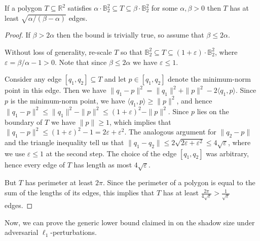\documentclass{article}\usepackage[a4paper,margin=20mm]{geometry}
\newcommand{\R}{\mathbb R}
\newcommand{\eps}{\varepsilon} %
\newcommand{\ball}{\mathbb{B}_2}
\renewcommand{\subset}{\subseteq}
\begin{document}
\begin{lemma}\label{lem:edgecount}
If a polygon $T \subset \R^2$ satisfies $\alpha\cdot \ball^2 \subset T \subset \beta\cdot \ball^2$
for some $\alpha, \beta > 0$ then $T$ has at least $\sqrt{\alpha/(\beta - \alpha)}$ edges.
\end{lemma}
\begin{proof}
If $\beta > 2\alpha$ then the bound is trivially true,
so assume that $\beta \leq 2\alpha$.

Without loss of generality, re-scale $T$ so that $\ball^2 \subset T \subset (1+\eps)\cdot \ball^2$,
where $\eps = \beta/\alpha - 1 > 0$. Note that since $\beta \leq 2 \alpha$ we have $\eps \leq 1$.

Consider any edge $[q_1, q_2] \subset T$ and let $p \in [q_1,q_2]$ denote
the minimum-norm point in this edge.
Then we have $\|q_1 - p\|^2 = \|q_1\|^2 + \|p\|^2 - 2\langle q_1,p\rangle$.
Since $p$ is the minimum-norm point, we have $\langle q_1, p \rangle \geq \|p\|^2$,
and hence $\|q_1 - p\|^2 \leq \|q_1\|^2 - \|p\|^2 \leq (1+\eps)^2 - \|p\|^2$.
Since $p$ lies on the boundary of $T$ we have $\|p\| \geq 1$,
which implies that $\|q_1-p\|^2 \leq (1+\eps)^2 - 1 = 2\eps + \eps^2$.
The analogous argument for $\|q_2-p\|$ and the triangle inequality tell us that
$\|q_1-q_2\| \leq 2\sqrt{2\eps + \eps^2} \leq 4\sqrt{\eps}$, where we use $\eps \leq 1$ at the second step. The choice of the edge $[q_1,q_2]$ was
arbitrary, hence every edge of $T$ has length as most $4\sqrt{\eps}$.

But $T$ has perimeter at least $2\pi$. Since the perimeter of a polygon
is equal to the sum of the lengths of its edges, this implies that
$T$ has at least $\frac{2\pi}{4\sqrt{\eps}} > \frac{1}{\sqrt \eps}$ edges.
\end{proof}

Now, we can prove the generic lower bound claimed in  on the shadow size
under adversarial $\ell_1$-perturbations.
\end{document}
